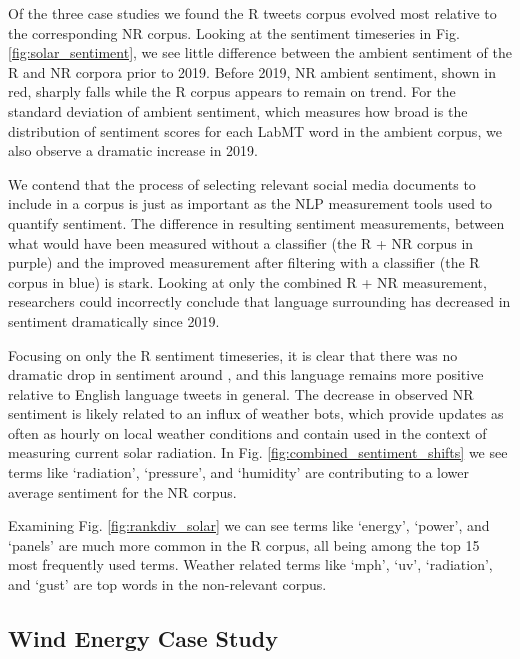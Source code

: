 Of the three case studies 
we found the R  tweets corpus evolved
most relative to the corresponding NR corpus.
Looking at the sentiment timeseries in Fig. \ref{fig:solar_sentiment}, 
we see little difference between the ambient sentiment of the R and NR corpora prior to 2019.
Before 2019, NR ambient sentiment, shown in red, sharply falls while the R corpus appears to remain on trend.
For the standard deviation of ambient sentiment, 
which measures how broad is the distribution of sentiment scores for each LabMT word in the ambient corpus,
we also observe a dramatic increase in 2019.

We contend that the process of selecting relevant social media documents to include in a corpus
is just as important as the NLP measurement tools
used to quantify sentiment.
The difference in resulting sentiment measurements,
between what would have been measured without a classifier
(the R + NR corpus in purple) 
and the improved measurement after filtering with a classifier 
(the R corpus in blue) 
is stark. 
Looking at only the combined R + NR measurement,
researchers could incorrectly conclude that language surrounding 
has decreased in sentiment dramatically since 2019. 

Focusing on only the R  sentiment timeseries,
it is clear that there was no dramatic drop in sentiment around , 
and this language remains more positive relative to English language tweets in general. 
The decrease in observed NR sentiment is likely related to an influx of weather bots,  
which provide updates as often as hourly on local weather conditions
and contain  used in the context of measuring current solar radiation. 
In Fig. \ref{fig:combined_sentiment_shifts} we see terms like `radiation', `pressure', and `humidity' are contributing to a lower average sentiment for the NR corpus.

Examining Fig. \ref{fig:rankdiv_solar} we can see terms like `energy', `power', and `panels' are much more common in the R corpus, all being among the top 15 most frequently used terms. Weather related terms like `mph', `uv', `radiation', and `gust' are top words in the non-relevant corpus. 





\subsection{Wind Energy Case Study}

